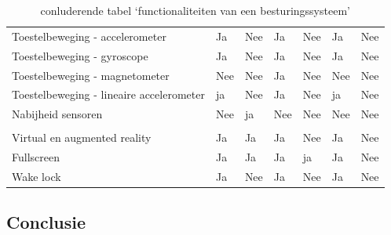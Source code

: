 \begin{table}[]
\begin{tabular}{p{6cm}p{13mm}p{13mm}p{13mm}p{13mm}p{13mm}p{13mm}}
			   Toestelbeweging - accelerometer & \cellcolor{green!40} Ja  & \cellcolor{red!50} Nee & \cellcolor{green!40} Ja  & \cellcolor{red!50} Nee& \cellcolor{green!40} Ja & \cellcolor{red!50} Nee \\
			   
			   Toestelbeweging - gyroscope & \cellcolor{green!40} Ja  & \cellcolor{red!50} Nee & \cellcolor{green!40} Ja  & \cellcolor{red!50} Nee& \cellcolor{green!40} Ja & \cellcolor{red!50} Nee \\
			   
			    Toestelbeweging - magnetometer & \cellcolor{red!50} Nee  & \cellcolor{red!50} Nee & \cellcolor{green!40} Ja  & \cellcolor{red!50} Nee& \cellcolor{red!50} Nee & \cellcolor{red!50} Nee \\
			   
			   Toestelbeweging - lineaire accelerometer  & \cellcolor{green!40} ja  & \cellcolor{red!50} Nee & \cellcolor{green!40} Ja  & \cellcolor{red!50} Nee& \cellcolor{green!40} ja  & \cellcolor{red!50} Nee \\
			   
			   Nabijheid sensoren &  \cellcolor{red!50} Nee  &  \cellcolor{green!40} ja  &  \cellcolor{red!50} Nee  & \cellcolor{red!50} Nee &  \cellcolor{red!50} Nee &  \cellcolor{red!50} Nee \\
			   
			   &  & &  &  &  &  \\
			   
			    Virtual en augmented reality  & \cellcolor{green!40} Ja  & \cellcolor{green!40} Ja & \cellcolor{green!40} Ja & \cellcolor{red!50} Nee  & \cellcolor{green!40} Ja & \cellcolor{red!50} Nee \\
			    
			     Fullscreen & \cellcolor{green!40} Ja  & \cellcolor{green!40} Ja & \cellcolor{green!40} Ja & \cellcolor{green!40} ja   & \cellcolor{green!40} Ja & \cellcolor{red!50} Nee \\
			   
			   Wake lock & \cellcolor{green!40} Ja  &  \cellcolor{red!50} Nee & \cellcolor{green!40} Ja  & \cellcolor{red!50} Nee & \cellcolor{green!40} Ja &  \cellcolor{red!50} Nee \\

		\end{tabular}	
		\caption{conluderende tabel ‘functionaliteiten van een besturingssysteem’}
	\end{table}

\clearpage
\subsection{Conclusie}


